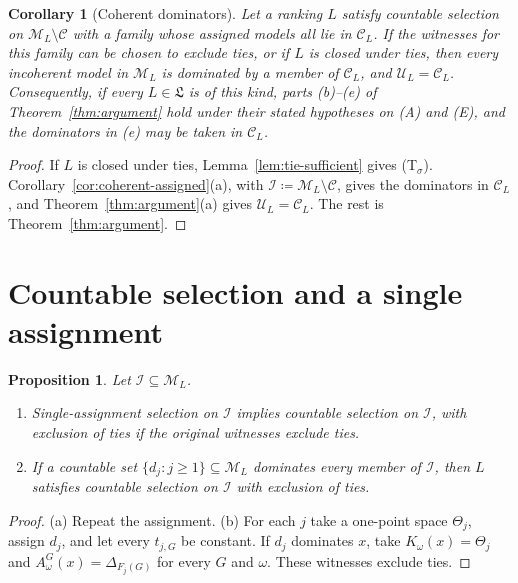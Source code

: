 \documentclass[11pt]{article}
\newtheorem{proposition}[theorem]{Proposition}
\newtheorem{corollary}[theorem]{Corollary}
\theoremstyle{definition}
\theoremstyle{remark}
\newcommand{\M}{\mathcal M}
\newcommand{\C}{\mathcal C}
\newcommand{\I}{\mathcal I}
\newcommand{\U}{\mathcal U}
\newcommand{\Lf}{\mathfrak L}
\begin{document}
\begin{corollary}[Coherent dominators]\label{cor:coherent-dominators}
Let a ranking $L$ satisfy countable selection on $\M_L\setminus\C$ with a family whose assigned models all lie in $\C_L$. If the witnesses for this family can be chosen to exclude ties, or if $L$ is closed under ties, then every incoherent model in $\M_L$ is dominated by a member of $\C_L$, and $\U_L=\C_L$. Consequently, if every $L\in\Lf$ is of this kind, parts (b)--(e) of Theorem~\ref{thm:argument} hold under their stated hypotheses on (A) and (E), and the dominators in (e) may be taken in $\C_L$.
\end{corollary}
\begin{proof}
If $L$ is closed under ties, Lemma~\ref{lem:tie-sufficient} gives (T$_\sigma$). Corollary~\ref{cor:coherent-assigned}(a), with $\I\coloneqq\M_L\setminus\C$, gives the dominators in $\C_L$, and Theorem~\ref{thm:argument}(a) gives $\U_L=\C_L$. The rest is Theorem~\ref{thm:argument}.
\end{proof}

\section{Countable selection and a single assignment}\label{sec:scope}

\begin{proposition}\label{prop:comparison}
Let $\I\subseteq\M_L$.
\begin{enumerate}[label=(\alph*)]
\item Single-assignment selection on $\I$ implies countable selection on $\I$, with exclusion of ties if the original witnesses exclude ties.
\item If a countable set $\{d_j:j\ge1\}\subseteq\M_L$ dominates every member of $\I$, then $L$ satisfies countable selection on $\I$ with exclusion of ties.
\end{enumerate}
\end{proposition}
\begin{proof}
(a) Repeat the assignment. (b) For each $j$ take a one-point space $\Theta_j$, assign $d_j$, and let every $t_{j,G}$ be constant. If $d_j$ dominates $x$, take $K_\omega(x)=\Theta_j$ and $A^G_\omega(x)=\Delta_{F_j(G)}$ for every $G$ and $\omega$. These witnesses exclude ties.
\end{proof}
\end{document}
